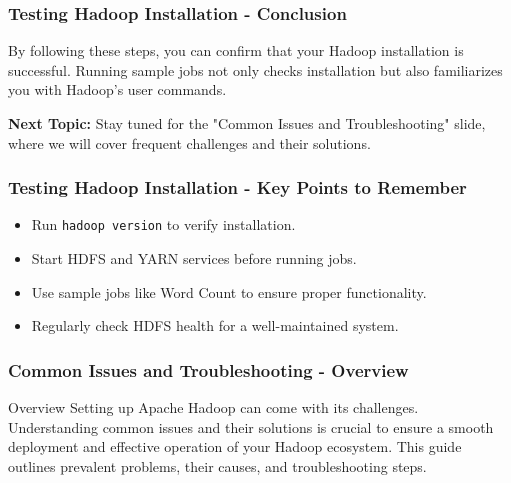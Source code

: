\documentclass{beamer}
\begin{document}
\begin{frame}
    \frametitle{Testing Hadoop Installation - Conclusion}
    By following these steps, you can confirm that your Hadoop installation is successful. Running sample jobs not only checks installation but also familiarizes you with Hadoop's user commands. 

    \textbf{Next Topic:} Stay tuned for the "Common Issues and Troubleshooting" slide, where we will cover frequent challenges and their solutions.
\end{frame}

\begin{frame}
    \frametitle{Testing Hadoop Installation - Key Points to Remember}
    \begin{itemize}
        \item Run \texttt{hadoop version} to verify installation.
        \item Start HDFS and YARN services before running jobs.
        \item Use sample jobs like Word Count to ensure proper functionality.
        \item Regularly check HDFS health for a well-maintained system.
    \end{itemize}
\end{frame}

\begin{frame}[fragile]
    \frametitle{Common Issues and Troubleshooting - Overview}
    \begin{block}{Overview}
        Setting up Apache Hadoop can come with its challenges. 
        Understanding common issues and their solutions is crucial 
        to ensure a smooth deployment and effective operation of 
        your Hadoop ecosystem. This guide outlines prevalent 
        problems, their causes, and troubleshooting steps.
    \end{block}
\end{frame}
\end{document}

